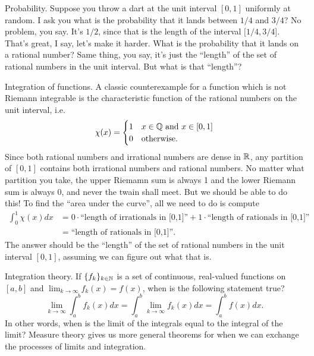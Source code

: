 \documentclass[main.tex]{subfiles}
\begin{document}
\begin{remunerate}
	\item Probability. Suppose you throw a dart at the unit interval $[0, 1]$ uniformly at random. I ask you what is the probability that it lands between $1/4$ and $3/4$? No problem, you say. It's $1/2$, since that is the length of the interval $[1/4, 3/4$]. That's great, I say, let's make it harder. What is the probability that it lands on a rational number? Same thing, you say, it's just the ``length'' of the set of rational numbers in the unit interval. But what is that ``length''?

	\item Integration of functions. A classic counterexample for a function which is not Riemann integrable is the characteristic function of the rational numbers on the unit interval, i.e. 
	\begin{equation}
	\chi(x) = \begin{cases}
	1 & x \in \mathbb{Q} \text{ and } x \in [0, 1] \\
	0 & \text{otherwise}.
	\end{cases}
	\end{equation}
	Since both rational numbers and irrational numbers are dense in ${\mathbb R}$, any partition of $[0, 1]$ contains both irrational numbers and rational numbers. No matter what partition you take, the upper Riemamn sum is always 1 and the lower Riemann sum is always 0, and never the twain shall meet. But we should be able to do this! To find the ``area under the curve'', all we need to do is compute
	\begin{align*}
	\int_0^1 \chi(x) dx &= 0 \cdot \text{``length of irrationals in [0,1]''} + 1 \cdot \text{``length of rationals in [0,1]''} \\
	&= \text{``length of rationals in [0,1]''}.
	\end{align*}
	The answer should be the ``length'' of the set of rational numbers in the unit interval $[0,1]$, assuming we can figure out what that is.

	\item Integration theory. If $\{ f_k \}_{k \in {\mathbb N}}$ is a set of continuous, real-valued functions on $[a,b]$ and $\lim_{k\rightarrow \infty} f_k(x) = f(x)$, when is the following statement true?
	\[
	\lim_{k\rightarrow \infty} \int_a^b f_k(x) dx = \int_a^b \lim_{k\rightarrow \infty} f_k(x) dx = 
	\int_a^b f(x) dx.
	\] 
	In other words, when is the limit of the integrals equal to the integral of the limit? Measure theory gives us more general theorems for when we can exchange the processes of limits and integration. 
\end{remunerate}
\end{document}
